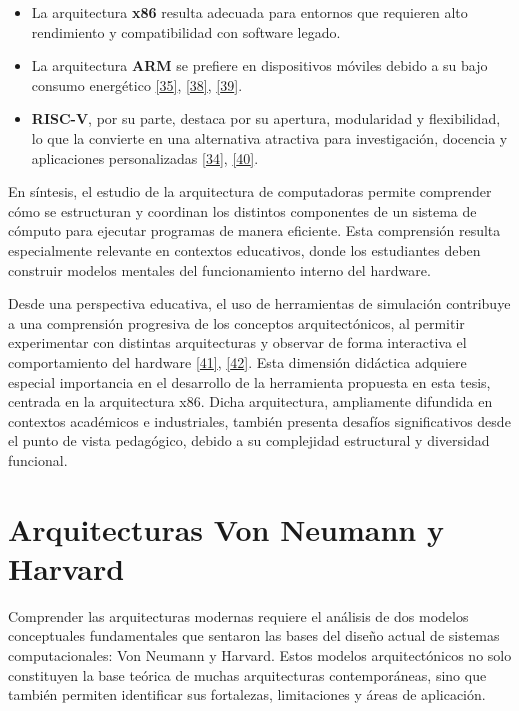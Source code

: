 \documentclass[12pt,oneside]{templates/unerthesis}
\providecommand{\tightlist}{%
  \setlength{\itemsep}{0pt}\setlength{\parskip}{0pt}}
\begin{document}
\begin{itemize}
\tightlist
\item
  La arquitectura \textbf{x86} resulta adecuada para entornos que requieren alto rendimiento y compatibilidad con software legado.
\item
  La arquitectura \textbf{ARM} se prefiere en dispositivos móviles debido a su bajo consumo energético \protect\hyperlink{ref-harris2015digital}{{[}35{]}}, \protect\hyperlink{ref-patterson_computer_2016}{{[}38{]}}, \protect\hyperlink{ref-belli2020iot}{{[}39{]}}.
\item
  \textbf{RISC-V}, por su parte, destaca por su apertura, modularidad y flexibilidad, lo que la convierte en una alternativa atractiva para investigación, docencia y aplicaciones personalizadas \protect\hyperlink{ref-waterman_risc-v_2014}{{[}34{]}}, \protect\hyperlink{ref-patterson_computer_2017}{{[}40{]}}.
\end{itemize}

En síntesis, el estudio de la arquitectura de computadoras permite comprender cómo se estructuran y coordinan los distintos componentes de un sistema de cómputo para ejecutar programas de manera eficiente. Esta comprensión resulta especialmente relevante en contextos educativos, donde los estudiantes deben construir modelos mentales del funcionamiento interno del hardware.

Desde una perspectiva educativa, el uso de herramientas de simulación contribuye a una comprensión progresiva de los conceptos arquitectónicos, al permitir experimentar con distintas arquitecturas y observar de forma interactiva el comportamiento del hardware \protect\hyperlink{ref-akram2019survey}{{[}41{]}}, \protect\hyperlink{ref-menchonherramientas}{{[}42{]}}. Esta dimensión didáctica adquiere especial importancia en el desarrollo de la herramienta propuesta en esta tesis, centrada en la arquitectura x86. Dicha arquitectura, ampliamente difundida en contextos académicos e industriales, también presenta desafíos significativos desde el punto de vista pedagógico, debido a su complejidad estructural y diversidad funcional.

\hypertarget{arquitecturas-von-neumann-y-harvard}{%
\section{Arquitecturas Von Neumann y Harvard}\label{arquitecturas-von-neumann-y-harvard}}

Comprender las arquitecturas modernas requiere el análisis de dos modelos conceptuales fundamentales que sentaron las bases del diseño actual de sistemas computacionales: Von Neumann y Harvard. Estos modelos arquitectónicos no solo constituyen la base teórica de muchas arquitecturas contemporáneas, sino que también permiten identificar sus fortalezas, limitaciones y áreas de aplicación.
\end{document}
